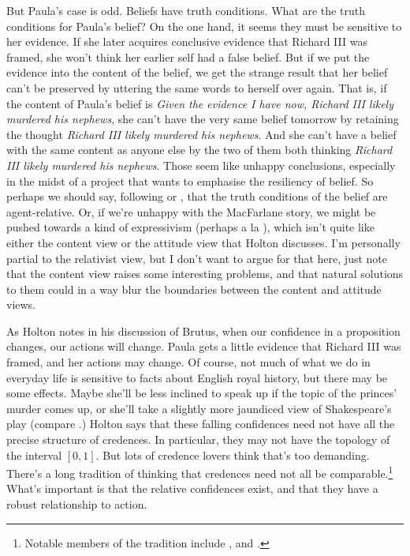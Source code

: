 But Paula's case is odd. Beliefs have truth conditions. What are the truth conditions for Paula's belief? On the one hand, it seems they must be sensitive to her evidence. If she later acquires conclusive evidence that Richard III was framed, she won't think her earlier self had a false belief. But if we put the evidence into the content of the belief, we get the strange result that her belief can't be preserved by uttering the same words to herself over again. That is, if the content of Paula's belief is \textit{Given the evidence I have now, Richard III likely murdered his nephews}, she can't have the very same belief tomorrow by retaining the thought \textit{Richard III likely murdered his nephews}. And she can't have a belief with the same content as anyone else by the two of them both thinking \textit{Richard III likely murdered his nephews}. Those seem like unhappy conclusions, especially in the midst of a project that wants to emphasise the resiliency of belief. So perhaps we should say, following \cite{Stephenson2007} or \cite{MacFarlane2011}, that the truth conditions of the belief are agent-relative. Or, if we're unhappy with the MacFarlane story, we might be pushed towards a kind of expressivism (perhaps a la \cite{Yalcin2011}), which isn't quite like either the content view or the attitude view that Holton discusses. I'm personally partial to the relativist view, but I don't want to argue for that here, just note that the content view raises some interesting problems, and that natural solutions to them could in a way blur the boundaries between the content and attitude views.

As Holton notes in his discussion of Brutus, when our confidence in a proposition changes, our actions will change. Paula gets a little evidence that Richard III was framed, and her actions may change. Of course, not much of what we do in everyday life is sensitive to facts about English royal history, but there may be some effects. Maybe she'll be less inclined to speak up if the topic of the princes' murder comes up, or she'll take a slightly more jaundiced view of Shakespeare's play (compare \cite{Friend2003}.) Holton says that these falling confidences need not have all the precise structure of credences. In particular, they may not have the topology of the interval $[0, 1]$. But lots of credence lovers think that's too demanding. There's a long tradition of thinking that credences need not all be comparable.\footnote{Notable members of the tradition include \cite{Levi1974}, \cite{Jeffrey1983} and \cite{vanFraassen1989}.} What's important is that the relative confidences exist, and that they have a robust relationship to action.

